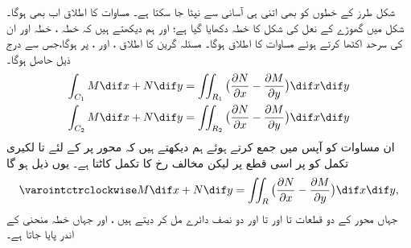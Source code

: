  شکل    طرز کے خطوں کو بھی اتنی ہی  آسانی  سے نپٹا جا سکتا ہے۔ مساوات     کا اطلاق اب بھی ہوگا۔ شکل      میں گھوڑے کے نعل کی شکل کا خطہ  دکھایا گیا ہے؛  اور ہم دیکھتے  ہیں کہ خطہ  ، خطہ   اور ان کی سرحد اکٹھا کرتے ہوئے مساوات      کا اطلاق  ہوگا۔  مسئلہ  گرین کا اطلاق   ،  اور ،   پر  ہوگا،جس سے درج ذیل حاصل ہوگا۔ 
\begin{align*}
\int_{C_1}M \dif x+N \dif y&=\iint_{R_1}\big(\frac{\partial N}{\partial x}-\frac{\partial M}{\partial y}\big) \dif x \dif y \\     
\int_{C_2} M \dif x + N \dif y &= \iint_{R_2} \big(\frac{\partial N}{\partial x} - \frac{\partial M}{\partial y}\big) \dif x \dif y 
\end{align*}
 ان  مساوات کو آپس میں جمع کرتے ہوئے ہم دیکھتے ہیں کہ محور     پر  کے لئے   تا     لکیری تکمل کو  پر اسی قطع  پر   لیکن مخالف رخ کا تکمل کاٹتا ہے۔ یوں   ذیل ہو گا
\begin{align*}
\varointctrclockwise M \dif x + N \dif y = \iint_R \big(\frac{\partial N}{\partial x} 
- \frac{\partial M}{\partial y}\big) \dif x \dif y, 
\end{align*}
 جہاں    محور کے دو قطعات    تا  اور  تا  اور دو نصف دائرے مل کر  دیتے ہیں ،  اور  جہاں خطہ   منحنی   کے اندر پایا جاتا ہے۔
 

